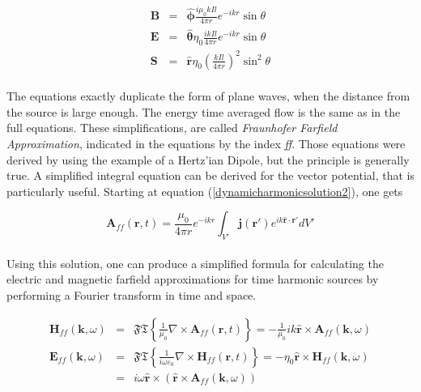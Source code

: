 \documentclass[a4paper,10pt]{thesis}
\begin{document}
\begin{eqnarray}
\mathbf{B} &=& \mathbf{\hat{\phi}} \frac{i \mu_0 k I l}{4 \pi r} e^{-ikr } \sin \theta \label{fraunhofer_B} \\
\mathbf{E} &=&\mathbf{ \hat{\theta}} \eta_0 \frac{i k I l}{4 \pi r} e^{-ikr } \sin \theta \label{fraunhofer_E} \\
\mathbf{S} &=& \mathbf{\hat{r}} \eta_0 \left( \frac{ k I l}{4 \pi r}\right)^2 \sin^2 \theta  \label{fraunhofer_S}
\end{eqnarray}

\paragraph*{}
The equations exactly duplicate the form of plane waves, when the distance from the source is large enough. The energy time averaged flow is the same as in the full equations. These simplifications, are called \emph{Fraunhofer Farfield Approximation}, indicated in the equations by the index \emph{ff}. Those equations were derived by using the example of a Hertz'ian Dipole, but the principle is generally true. A simplified integral equation can be derived for the vector potential, that is particularly useful. Starting at equation (\ref{dynamicharmonicsolution2}), one gets

\begin{equation}\label{fraunhofer_A}
 \mathbf{A}_{ff}(\mathbf{r},t) = \frac{\mu_0}{4 \pi r} e^{-ikr} \int_{V'} \mathbf{j}(\mathbf{r}') e^{ik \mathbf{\hat{r}} \cdot \mathbf{r}' } dV'
\end{equation}

\paragraph*{}
Using this solution, one can produce a simplified formula for calculating the electric and magnetic farfield approximations for time harmonic sources by performing a Fourier transform in time and space.

\begin{eqnarray}
\mathbf{H}_{ff} (\mathbf{k},\omega)&=& \mathfrak{FT} \left\{ \frac{1}{\mu_0} \nabla \times \mathbf{A}_{ff}(\mathbf{r},t) \right\} = - \frac{1}{\mu_0} ik\mathbf{\hat{r}} \times \mathbf{A}_{ff}(\mathbf{k},\omega) \label{rule_Hff}\\
\mathbf{E}_{ff} (\mathbf{k},\omega)&=&  \mathfrak{FT} \left\{ \frac{1}{i\omega \varepsilon_0 } \nabla \times \mathbf{H}_{ff}(\mathbf{r},t) \right\}= -\eta_0 \mathbf{\hat{r}} \times \mathbf{H}_{ff}(\mathbf{k},\omega) \\
&=& i \omega \mathbf{\hat{r}} \times ( \mathbf{\hat{r}} \times \mathbf{A}_{ff}(\mathbf{k},\omega)) \label{rule_Eff}
\end{eqnarray}
\end{document}
